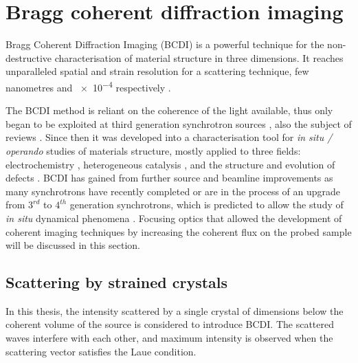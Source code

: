 \section{Bragg coherent diffraction imaging} \label{sec:BCDI}

Bragg Coherent Diffraction Imaging (BCDI) \parencite{Robinson2001, Pfeifer2006, Robinson2009} is a powerful technique for the non-destructive characterisation of material structure in three dimensions.
It reaches unparalleled spatial and strain resolution for a scattering technique, few nanometres \parencite{Labat2015, Cherukara2018a} and \num{e-4} respectively \parencite{Newton2010, Lauraux2020}.

The BCDI method is reliant on the coherence of the light available, thus only began to be exploited at third generation synchrotron sources \parencite{Miao1999, Miao2000, Robinson2001, Labat2007, Robinson2009, Vaxelaire2010, Chamard2010, Clark2012, Clark2013, Yang2013, Xiong2014}, also the subject of reviews \parencite{Nugent2010, Miao2015}.
Since then it was developed into a characterisation tool for \textit{in situ / operando} studies of materials structure, mostly applied to three fields: electrochemistry \parencite{Ulvestad2015}, heterogeneous catalysis \parencite{Ulvestad2016}, and the structure and evolution of defects \parencite{Labat2015}.
BCDI has gained from further source and beamline improvements as many synchrotrons have recently completed or are in the process of an upgrade from $3^{rd}$ to $4^{th}$ generation synchrotrons, which is predicted to allow the study of \textit{in situ} dynamical phenomena \parencite{Lo2018}.
Focusing optics that allowed the development of coherent imaging techniques by increasing the coherent flux on the probed sample will be discussed in this section.

\subsection{Scattering by strained crystals}\label{sec:StrainBCDI}

In this thesis, the intensity scattered by a single crystal of dimensions below the coherent volume of the source is considered to introduce BCDI.
The scattered waves interfere with each other, and maximum intensity is observed when the scattering vector satisfies the Laue condition.

